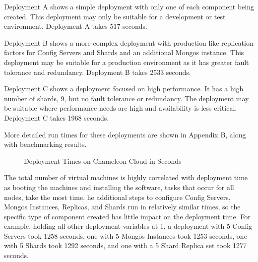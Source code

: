 \documentclass[9pt,twocolumn,twoside]{styles/osajnl}
\begin{document}
Deployment A shows a simple deployment with only one of each component being created.  This deployment may only be suitable for a development or test environment.  Deployment A takes 517 seconds.

Deployment B shows a more complex deployment with production like replication factors for Config Servers and Shards and an additional Mongos instance.  This deployment may be suitable for a production environment as it has greater fault tolerance and redundancy.  Deployment B takes 2533 seconds.

Deployment C shows a deployment focused on high performance.  It has a high number of shards, 9, but no fault tolerance or redundancy.  The deployment may be suitable where performance needs are high and availability is less critical.  Deployment C takes 1968 seconds.

More detailed run times for these deployments are shown in Appendix B, along with benchmarking results.

\begin{figure}[ht]
  \caption{Deployment Times on Chameleon Cloud in Seconds}
\end{figure}

The total number of virtual machines is highly correlated with deployment time as booting the machines and installing the software, tasks that occur for all nodes, take the most time.  he additional steps to configure Config Servers, Mongos Instances, Replicas, and Shards run in relatively similar times, so the specific type of component created has little impact on the deployment time.  For example, holding all other deployment variables at 1, a deployment with 5 Config Servers took 1258 seconds, one with 5 Mongos Instances took 1253 seconds, one with 5 Shards took 1292 seconds, and one with a 5 Shard Replica set took 1277 seconds.
\end{document}
